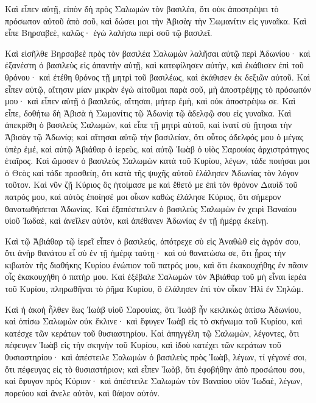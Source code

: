 {Καὶ εἶπεν αὐτῇ, εἰπὸν δὴ πρὸς Σαλωμὼν τὸν βασιλέα, ὅτι οὐκ ἀποστρέψει τὸ πρόσωπον αὐτοῦ ἀπὸ σοῦ, καὶ δώσει μοι τὴν Ἀβισὰγ τὴν Σωμανίτιν εἰς γυναῖκα.
Καὶ εἶπε Βηρσαβεὲ, καλῶς· ἐγὼ λαλήσω περὶ σοῦ τῷ βασιλεῖ.
\par }{\PP {}Καὶ εἰσῆλθε Βηρσαβεὲ πρὸς τὸν βασιλέα Σαλωμὼν λαλῆσαι αὐτῷ περὶ Ἀδωνίου· καὶ ἐξανέστη ὁ βασιλεὺς εἰς ἀπαντὴν αὐτῇ, καὶ κατεφίλησεν αὐτὴν, καὶ ἐκάθισεν ἐπὶ τοῦ θρόνου· καὶ ἐτέθη θρόνος τῇ μητρὶ τοῦ βασιλέως, καὶ ἐκάθισεν ἐκ δεξιῶν αὐτοῦ.
Καὶ εἶπεν αὐτῷ, αἴτησιν μίαν μικρὰν ἐγὼ αἰτοῦμαι παρὰ σοῦ, μὴ ἀποστρέψῃς τὸ πρόσωπόν μου· καὶ εἶπεν αὐτῇ ὁ βασιλεύς, αἴτησαι, μήτερ ἐμὴ, καὶ οὐκ ἀποστρέψω σε.
Καὶ εἶπε, δοθήτω δὴ Ἀβισὰ ἡ Σωμανίτις τῷ Ἀδωνίᾳ τῷ ἀδελφῷ σου εἰς γυναῖκα.
Καὶ ἀπεκρίθη ὁ βασιλεὺς Σαλωμὼν, καὶ εἶπε τῇ μητρὶ αὐτοῦ, καὶ ἱνατί σὺ ᾔτησαι τὴν Ἀβισὰγ τῷ Ἀδωνίᾳ; καὶ αἴτησαι αὐτῷ τὴν βασιλείαν, ὅτι οὗτος ἀδελφός μου ὁ μέγας ὑπὲρ ἐμέ, καὶ αὐτῷ Ἀβιάθαρ ὁ ἱερεὺς, καὶ αὐτῷ Ἰωὰβ ὁ υἱὸς Σαρουίας ἀρχιστράτηγος ἑταῖρος.
Καὶ ὤμοσεν ὁ βασιλεὺς Σαλωμὼν κατὰ τοῦ Κυρίου, λέγων, τάδε ποιήσαι μοι ὁ Θεὸς καὶ τάδε προσθείη, ὅτι κατὰ τῆς ψυχῆς αὐτοῦ ἐλάλησεν Ἀδωνίας τὸν λόγον τοῦτον.
Καὶ νῦν ζῇ Κύριος ὃς ἡτοίμασε με καὶ ἔθετό με ἐπὶ τὸν θρόνον Δαυὶδ τοῦ πατρός μου, καὶ αὐτὸς ἐποίησέ μοι οἶκον καθὼς ἐλάλησε Κύριος, ὅτι σήμερον θανατωθήσεται Ἀδωνίας.
Καὶ ἐξαπέστειλεν ὁ βασιλεὺς Σαλωμὼν ἐν χειρὶ Βαναίου υἱοῦ Ἰωδαὲ, καὶ ἀνεῖλεν αὐτὸν, καὶ ἀπέθανεν Ἀδωνίας ἐν τῇ ἡμέρᾳ ἐκείνῃ.
\par }{\PP {}Καὶ τῷ Ἀβιάθαρ τῷ ἱερεῖ εἶπεν ὁ βασιλεύς, ἀπότρεχε σὺ εἰς Ἀναθὼθ εἰς ἀγρόν σου, ὅτι ἀνὴρ θανάτου εἶ σὺ ἐν τῇ ἡμέρᾳ ταύτῃ· καὶ οὐ θανατώσω σε, ὅτι ᾖρας τὴν κιβωτὸν τῆς διαθήκης Κυρίου ἐνώπιον τοῦ πατρός μου, καὶ ὅτι ἐκακουχήθης ἐν πᾶσιν οἷς ἐκακουχήθη ὁ πατήρ μου.
Καὶ ἐξέβαλε Σαλωμὼν τὸν Ἀβιάθαρ τοῦ μὴ εἶναι ἱερέα τοῦ Κυρίου, πληρωθῆναι τὸ ῥῆμα Κυρίου, ὃ ἐλάλησεν ἐπὶ τὸν οἶκον Ἡλὶ ἐν Σηλώμ.
\par }{\PP {}Καὶ ἡ ἀκοὴ ἦλθεν ἕως Ἰωὰβ υἱοῦ Σαρουίας, ὅτι Ἰωὰβ ἦν κεκλικὼς ὀπίσω Ἀδωνίου, καὶ ὀπίσω Σαλωμὼν οὐκ ἔκλινε· καὶ ἔφυγεν Ἰωὰβ εἰς τὸ σκήνωμα τοῦ Κυρίου, καὶ κατέσχε τῶν κεράτων τοῦ θυσιαστηρίου.
Καὶ ἀπηγγέλη τῷ Σαλωμὼν, λέγοντες, ὅτι πέφευγεν Ἰωὰβ εἰς τὴν σκηνὴν τοῦ Κυρίου, καὶ ἰδοὺ κατέχει τῶν κεράτων τοῦ θυσιαστηρίου· καὶ ἀπέστειλε Σαλωμὼν ὁ βασιλεὺς πρὸς Ἰωὰβ, λέγων, τί γέγονέ σοι, ὅτι πέφευγας εἰς τὸ θυσιαστήριον; καὶ εἶπεν Ἰωὰβ, ὅτι ἐφοβήθην ἀπὸ προσώπου σου, καὶ ἔφυγον πρὸς Κύριον· καὶ ἀπέστειλε Σαλωμὼν τὸν Βαναίου υἱὸν Ἰωδαὲ, λέγων, πορεύου καὶ ἄνελε αὐτὸν, καὶ θάψον αὐτόν.
}
